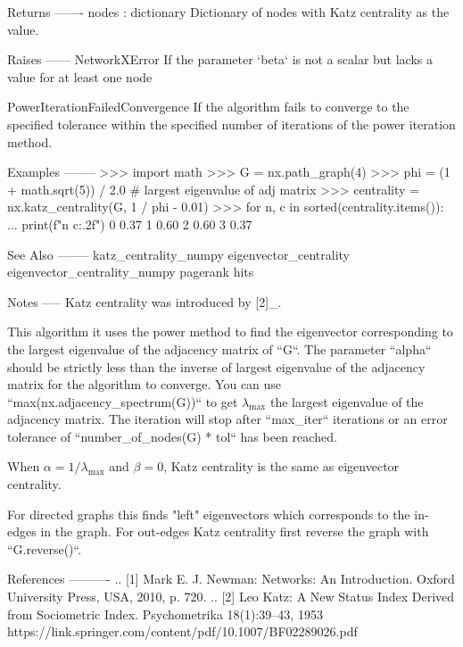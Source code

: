 \begin{DoxyVerb}
Returns
-------
nodes : dictionary
   Dictionary of nodes with Katz centrality as the value.

Raises
------
NetworkXError
   If the parameter `beta` is not a scalar but lacks a value for at least
   one node

PowerIterationFailedConvergence
    If the algorithm fails to converge to the specified tolerance
    within the specified number of iterations of the power iteration
    method.

Examples
--------
>>> import math
>>> G = nx.path_graph(4)
>>> phi = (1 + math.sqrt(5)) / 2.0  # largest eigenvalue of adj matrix
>>> centrality = nx.katz_centrality(G, 1 / phi - 0.01)
>>> for n, c in sorted(centrality.items()):
...     print(f"{n} {c:.2f}")
0 0.37
1 0.60
2 0.60
3 0.37

See Also
--------
katz_centrality_numpy
eigenvector_centrality
eigenvector_centrality_numpy
pagerank
hits

Notes
-----
Katz centrality was introduced by [2]_.

This algorithm it uses the power method to find the eigenvector
corresponding to the largest eigenvalue of the adjacency matrix of ``G``.
The parameter ``alpha`` should be strictly less than the inverse of largest
eigenvalue of the adjacency matrix for the algorithm to converge.
You can use ``max(nx.adjacency_spectrum(G))`` to get $\lambda_{\max}$ the largest
eigenvalue of the adjacency matrix.
The iteration will stop after ``max_iter`` iterations or an error tolerance of
``number_of_nodes(G) * tol`` has been reached.

When $\alpha = 1/\lambda_{\max}$ and $\beta=0$, Katz centrality is the same
as eigenvector centrality.

For directed graphs this finds "left" eigenvectors which corresponds
to the in-edges in the graph. For out-edges Katz centrality
first reverse the graph with ``G.reverse()``.

References
----------
.. [1] Mark E. J. Newman:
   Networks: An Introduction.
   Oxford University Press, USA, 2010, p. 720.
.. [2] Leo Katz:
   A New Status Index Derived from Sociometric Index.
   Psychometrika 18(1):39–43, 1953
   https://link.springer.com/content/pdf/10.1007/BF02289026.pdf
\end{DoxyVerb}
 \mbox{\label{namespacenetworkx_1_1algorithms_1_1centrality_1_1katz_a6b99ac114367ee092b67536f778f33a0}} 
